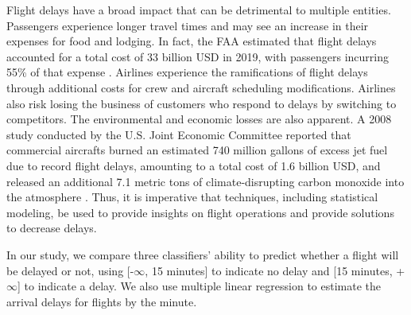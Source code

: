 \documentclass{article}
\begin{document}
Flight delays have a broad impact that can be detrimental to multiple entities. Passengers experience longer travel times and may see an increase in their expenses for food and lodging. In fact, the FAA estimated that flight delays accounted for a total cost of 33 billion USD in 2019, with passengers incurring 55\% of that expense \cite{6_faa_cost_delay2019}. Airlines experience the ramifications of flight delays through additional costs for crew and aircraft scheduling modifications. Airlines also risk losing the business of customers who respond to delays by switching to competitors. The environmental and economic losses are also apparent. A 2008 study conducted by the U.S. Joint Economic Committee reported that commercial aircrafts burned an estimated 740 million gallons of excess jet fuel due to record flight delays, amounting to a total cost of 1.6 billion USD, and released an additional 7.1 metric tons of climate-disrupting carbon monoxide into the atmosphere \cite{7_jec_cost_dealy}. Thus, it is imperative that techniques, including statistical modeling, be used to provide insights on flight operations and provide solutions to decrease delays.

In our study, we compare three classifiers’ ability to predict whether a flight will be delayed or not, using [-$\infty$, 15 minutes] to indicate no delay and [15 minutes, +$\infty$] to indicate a delay. We also use multiple linear regression to estimate the arrival delays for flights by the minute.
\end{document}
